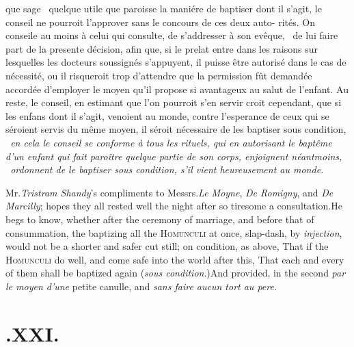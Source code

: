 \documentclass{article}
\begin{document}
que sage \et\  quelque utile que paroisse la maniére\break
de baptiser dont il s’agit, le conseil ne pourroit\break
l’approver sans le concours de ces deux auto-\break
rités.  On conseile au moins à celui qui consulte,\break
de s’addresser à son evêque, \et\  de lui faire part\break
de la presente décision, afin que, si le prelat\break
entre dans les raisons sur lesquelles les docteurs\break
soussignés s’appuyent, il puisse être autorisé\break
dans le cas de nécessité, ou il risqueroit trop\break
d'attendre que la permission fût demandée \et\ \break
accordée d’employer le moyen qu’il propose si\break
avantageux au salut de l’enfant. Au reste,\break
le conseil, en estimant que l’on pourroit s’en\break
servir croit cependant, que si les enfans dont\break
il s’agit, venoient au monde, contre l’esperance
de ceux qui se séroient servis du même moyen, il séroit nécessaire de
les baptiser \upshape sous condition, \itshape \et\  en cela le conseil se conforme à
tous les rituels, qui en autorisant le baptême d’un enfant qui fait paroître quelque
partie de son corps, enjoignent néantmoins, \et\  ordonnent de le baptiser \upshape
sous condition, \itshape s’il vient heureusement au monde.  
\egroup 

\noindent
{}

\bigskip

\vbox{}

\bigskip

Mr.\@ \textit{Tristram Shandy}’s compliments to Messrs.\@ \textit{Le
Moyne}, \textit{De Romigny}, and \textit{De Marcilly}; hopes they all
rested well the night after so tiresome a consultation.\tsk\break  He
begs to know, whether after the ceremony of marriage, and before
that of consummation, the baptizing all the
\textsc{Homunculi} at once, slap-dash, by \textit{injection},
would not be a shorter and safer cut still; on condition, as above,
That if the \textsc{Homunculi} do well, and come safe into
the world after this, That each and every of them shall be baptized
again (\textit{sous condition}.)\tsh  And provided, in the
second\break
{}
\textit{par le moyen d’une} petite canulle, and\break 
\textit{sans faire aucun tort au pere.}

\section{.\enspace XXI.}
\end{document}
